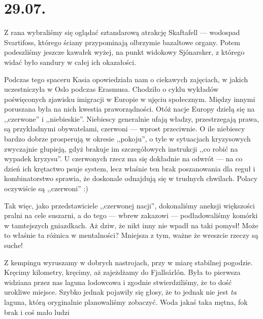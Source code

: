 \chapter*{29.07.}

Z rana wybraliśmy się oglądać sztandarową atrakcję Skaftafell --- wodospad Svartifoss, którego ściany przypominają olbrzymie bazaltowe organy. Potem podeszliśmy jeszcze kawałek wyżej, na punkt widokowy Sjónarsker, z którego widać było sandury w całej ich okazałości.

Podczas tego spaceru Kasia opowiedziała nam o ciekawych zajęciach, w jakich uczestniczyła w Oslo podczas Erasmusa. Chodziło o cyklu wykładów poświęconych zjawisku imigracji w Europie w ujęciu społecznym. Między innymi poruszana była na nich kwestia praworządności. Otóż nacje Europy dzielą się na ,,czerwone'' i ,,niebieskie''. Niebiescy generalnie ufają władzy, przestrzegają prawa, są przykładnymi obywatelami, czerwoni --- wprost przeciwnie. O ile niebiescy bardzo dobrze prosperują w okresie ,,pokoju'', o tyle w sytuacjach kryzysowych zwyczajnie głupieją, gdyż brakuje im szczegółowych instrukcji ,,co robić na wypadek kryzysu''. U czerwonych rzecz ma się dokładnie na odwrót --- na co dzień ich krętactwo psuje system, lecz właśnie ten brak poszanowania dla reguł i kombinatorstwo sprawia, że doskonale odnajdują się w trudnych chwilach. Polacy oczywiście są ,,czerwoni'' :)

Tak więc, jako przedstawiciele ,,czerwonej nacji'', dokonaliśmy aneksji większości pralni na cele suszarni, a do tego --- wbrew zakazowi --- podładowaliśmy komórki w tamtejszych gniazdkach. Aż dziw, że nikt inny nie wpadł na taki pomysł! Może to właśnie ta różnica w mentalności? Mniejsza z tym, ważne że wreszcie rzeczy są suche!


Z kempingu wyruszamy w dobrych nastrojach, przy w miarę stabilnej pogodzie. Kręcimy kilometry, kręcimy, aż zajeżdżamy do Fjallsárlón. Była to pierwsza widziana przez nas laguna lodowcowa i zgodnie stwierdziliśmy, że to dość urokliwe miejsce. Szybko jednak pojawiły się głosy, że to jednak nie jest \emph{ta} laguna, którą oryginalnie planowaliśmy zobaczyć. Woda jakaś taka mętna, fok brak i coś mało ludzi\textellipsis


